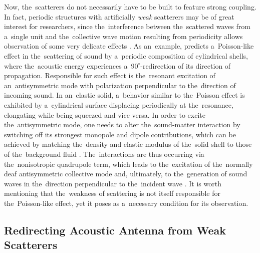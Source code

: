 Now, the~scatterers do not necessarily have to be built to feature strong coupling.
In fact, periodic structures with artificially {\it weak} scatterers may be of great interest for researchers, since the~interference between the~scattered waves from a~single unit and the~collective wave motion resulting from periodicity allows observation of some very delicate effects \cite{martin}.
As an~example, \cite{norris1} predicts a~Poisson-like effect in the~scattering of sound by a~periodic composition of cylindrical shells, where the~acoustic energy experiences a~$90^{\circ}$-redirection of its direction of propagation.
Responsible for such effect is the~resonant excitation of an~antisymmetric mode with polarization perpendicular to the~direction of incoming sound.
In an~elastic solid, a~behavior similar to the~Poisson effect is exhibited by a~cylindrical surface displacing periodically at the~resonance, elongating while being squeezed and vice versa.
In order to excite the~antisymmetric mode, one needs to alter the~sound-matter interaction by switching off its strongest monopole and dipole contributions, which can be achieved by matching the~density and elastic modulus of the~solid shell to those of the~background fluid \cite{norris2,norris3}.
The~interactions are thus occurring via the~nonisotropic quadrupole term, which leads to the~excitation of the~normally deaf antisymmetric collective mode and, ultimately, to the~generation of sound waves in the~direction perpendicular to the~incident wave \cite{norris1}.
It is worth mentioning that the~weakness of scattering is not itself responsible for the~Poisson-like effect, yet it poses as a~necessary condition for its observation.

\subsection{Redirecting Acoustic Antenna from Weak Scatterers}

